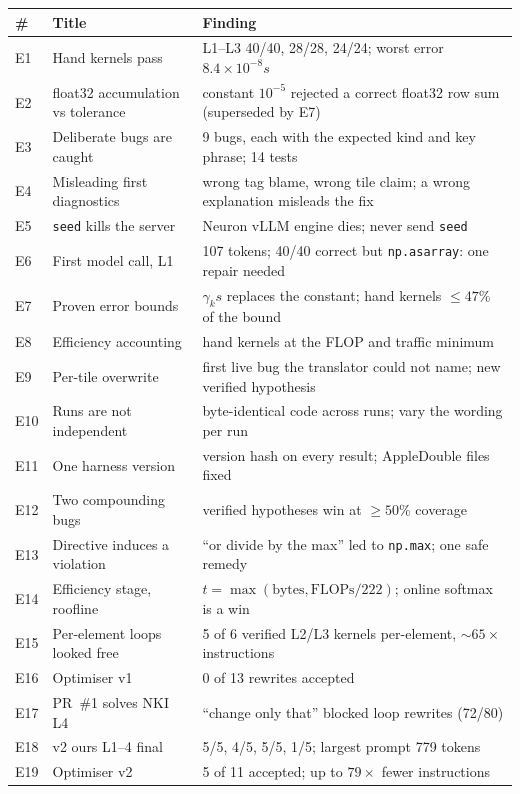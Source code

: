 \documentclass[11pt]{article}
\newcommand{\code}[1]{\texttt{#1}}
\begin{document}
{\small
\noindent\begin{tabularx}{\linewidth}{@{}l>{\raggedright\arraybackslash}p{5.0cm}Y@{}}
\toprule
\# & Title & Finding \\
\midrule
E1 & Hand kernels pass & L1--L3 40/40, 28/28, 24/24; worst error $8.4\times10^{-8}s$ \\
E2 & float32 accumulation vs tolerance & constant $10^{-5}$ rejected a correct float32 row sum (superseded by E7) \\
E3 & Deliberate bugs are caught & 9 bugs, each with the expected kind and key phrase; 14 tests \\
E4 & Misleading first diagnostics & wrong tag blame, wrong tile claim; a wrong explanation misleads the fix \\
E5 & \code{seed} kills the server & Neuron vLLM engine dies; never send \code{seed} \\
E6 & First model call, L1 & 107 tokens; 40/40 correct but \code{np.asarray}: one repair needed \\
E7 & Proven error bounds & $\gamma_k s$ replaces the constant; hand kernels $\le47\%$ of the bound \\
E8 & Efficiency accounting & hand kernels at the FLOP and traffic minimum \\
E9 & Per-tile overwrite & first live bug the translator could not name; new verified hypothesis \\
E10 & Runs are not independent & byte-identical code across runs; vary the wording per run \\
E11 & One harness version & version hash on every result; AppleDouble files fixed \\
E12 & Two compounding bugs & verified hypotheses win at $\ge50\%$ coverage \\
E13 & Directive induces a violation & ``or divide by the max'' led to \code{np.max}; one safe remedy \\
E14 & Efficiency stage, roofline & $t=\max(\text{bytes},\text{FLOPs}/222)$; online softmax is a win \\
E15 & Per-element loops looked free & 5 of 6 verified L2/L3 kernels per-element, $\sim65\times$ instructions \\
E16 & Optimiser v1 & 0 of 13 rewrites accepted \\
E17 & PR~\#1 solves NKI L4 & ``change only that'' blocked loop rewrites (72/80) \\
E18 & v2 ours L1--4 final & 5/5, 4/5, 5/5, 1/5; largest prompt 779 tokens \\
E19 & Optimiser v2 & 5 of 11 accepted; up to $79\times$ fewer instructions \\

\end{tabularx}}
\end{document}
